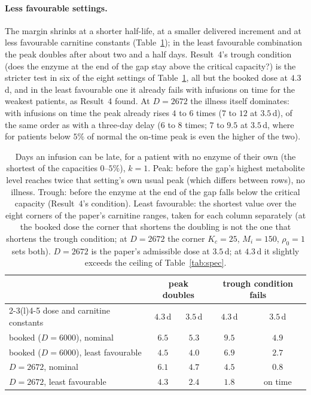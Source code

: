 \documentclass[11pt,a4paper]{article}
\begin{document}
\paragraph{Less favourable settings.} The margin shrinks at a shorter half-life, at a smaller
delivered increment and at less favourable carnitine constants (Table~\ref{tab:delay}); in the
least favourable combination the peak doubles after about two and a half days. Result~4's trough
condition (does the enzyme at the end of the gap stay above the critical capacity?) is the
stricter test in six of the eight settings of Table~\ref{tab:delay}, all but the booked dose at
$4.3$\,d, and in the least favourable one it already fails with infusions on time for the weakest
patients, as Result~4 found. At $D=2672$ the illness itself dominates: with infusions on time the
peak already rises $4$ to $6$ times ($7$ to $12$ at $3.5$\,d), of the same order as with a
three-day delay ($6$ to $8$ times; $7$ to $9.5$ at $3.5$\,d, where for patients below $5\%$ of
normal the on-time peak is even the higher of the two).

\begin{table}[t]
\centering\small
\caption{\label{tab:delay}Days an infusion can be late, for a patient with no enzyme of their own
(the shortest of the capacities $0$--$5\%$), $k=1$. Peak: before the gap's highest metabolite
level reaches twice that setting's own usual peak (which differs between rows), no illness.
Trough: before the enzyme at the end of the gap falls below the critical capacity (Result~4's
condition). Least favourable: the shortest value over the eight corners of the paper's
carnitine ranges, taken for each column separately (at the booked dose the corner that shortens
the doubling is not the one that shortens the trough condition; at $D=2672$ the corner $K_c=25$,
$M_i=150$, $\rho_0=1$ sets both). $D=2672$ is the paper's admissible dose at
$3.5$\,d; at $4.3$\,d it slightly exceeds the ceiling of Table~\ref{tab:spec}.}
\begin{tabular}{@{}lcccc@{}}
\toprule
& \multicolumn{2}{c}{peak doubles} & \multicolumn{2}{c}{trough condition fails} \\
\cmidrule(lr){2-3}\cmidrule(l){4-5}
dose and carnitine constants & $4.3$\,d & $3.5$\,d & $4.3$\,d & $3.5$\,d \\
\midrule
booked ($D=6000$), nominal & $6.5$ & $5.3$ & $9.5$ & $4.9$ \\
booked ($D=6000$), least favourable & $4.5$ & $4.0$ & $6.9$ & $2.7$ \\
$D=2672$, nominal & $6.1$ & $4.7$ & $4.5$ & $0.8$ \\
$D=2672$, least favourable & $4.3$ & $2.4$ & $1.8$ & on time \\
\bottomrule
\end{tabular}
\end{table}
\end{document}

